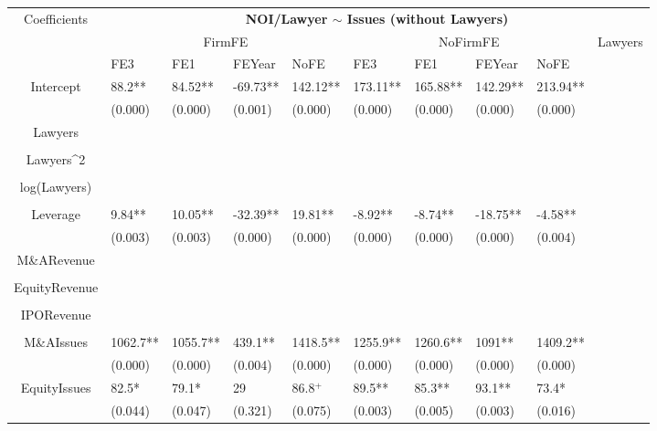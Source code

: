 \documentclass{article}
\begin{document}
\begin{table}[H]
\centering
\begin{tabular}{|clllllllll|}
\hline
\multirow{3}{*}{Coefficients} & \multicolumn{9}{c|}{\textbf{NOI/Lawyer $\sim$ Issues (without Lawyers)}} \\
\cline{2-10}
& \multicolumn{4}{c}{FirmFE} & \multicolumn{4}{c}{NoFirmFE} & \multirow{2}{*}{Lawyers} \\
\cline{2-9}
& FE3 & FE1 & FEYear & NoFE & FE3 & FE1 & FEYear & NoFE &  \\
\hline
 
Intercept & 88.2** & 84.52** & -69.73** & 142.12** & 173.11** & 165.88** & 142.29** & 213.94** & \\ 
   & (0.000) & (0.000) & (0.001) & (0.000) & (0.000) & (0.000) & (0.000) & (0.000) & \\ 
  Lawyers &  &  &  &  &  &  &  &  & \\ 
   &  &  &  &  &  &  &  &  & \\ 
  Lawyers^2 &  &  &  &  &  &  &  &  & \\ 
   &  &  &  &  &  &  &  &  & \\ 
  log(Lawyers) &  &  &  &  &  &  &  &  & \\ 
   &  &  &  &  &  &  &  &  & \\ 
  Leverage & 9.84** & 10.05** & -32.39** & 19.81** & -8.92** & -8.74** & -18.75** & -4.58** & \\ 
   & (0.003) & (0.003) & (0.000) & (0.000) & (0.000) & (0.000) & (0.000) & (0.004) & \\ 
  M\&ARevenue &  &  &  &  &  &  &  &  & \\ 
   &  &  &  &  &  &  &  &  & \\ 
  EquityRevenue &  &  &  &  &  &  &  &  & \\ 
   &  &  &  &  &  &  &  &  & \\ 
  IPORevenue &  &  &  &  &  &  &  &  & \\ 
   &  &  &  &  &  &  &  &  & \\ 
  M\&AIssues & 1062.7** & 1055.7** & 439.1** & 1418.5** & 1255.9** & 1260.6** & 1091** & 1409.2** & \\ 
   & (0.000) & (0.000) & (0.004) & (0.000) & (0.000) & (0.000) & (0.000) & (0.000) & \\ 
  EquityIssues & 82.5* & 79.1* & 29 & 86.8$^{+}$ & 89.5** & 85.3** & 93.1** & 73.4* & \\ 
   & (0.044) & (0.047) & (0.321) & (0.075) & (0.003) & (0.005) & (0.003) & (0.016) & \\ 

\end{tabular}
\end{table}
\end{document}
